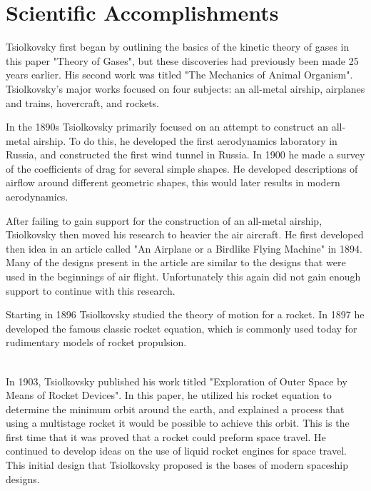 \documentclass[10pt]{armath}
\begin{document}
\section{Scientific Accomplishments}%
\label{sec:scientific_accomplishments}

Tsiolkovsky first began by outlining the basics of the kinetic theory of gases
in this paper "Theory of Gases", but these discoveries had previously been made
25 years earlier. His second work was titled "The Mechanics of Animal
Organism". Tsiolkovsky's major works focused on four subjects: an all-metal
airship, airplanes and trains, hovercraft, and rockets.

In the 1890s Tsiolkovsky primarily focused on an attempt to construct an
all-metal airship. To do this, he developed the first aerodynamics laboratory
in Russia, and constructed the first wind tunnel in Russia. In 1900 he made a
survey of the coefficients of drag for several simple shapes. He developed
descriptions of airflow around different geometric shapes, this would later
results in modern aerodynamics.

After failing to gain support for the construction of an all-metal airship,
Tsiolkovsky then moved his research to heavier the air aircraft. He first
developed then idea in an article called "An Airplane or a Birdlike Flying
Machine" in 1894. Many of the designs present in the article are similar to the
designs that were used in the beginnings of air flight. Unfortunately this again
did not gain enough support to continue with this research.

Starting in 1896 Tsiolkovsky studied the theory of motion for a rocket. In 1897
he developed the famous classic rocket equation, which is commonly used today
for rudimentary models of rocket propulsion.

\begin{align*}
\end{align*}

In 1903, Tsiolkovsky published his work titled "Exploration of Outer Space by
Means of Rocket Devices". In this paper, he utilized his rocket equation to
determine the minimum orbit around the earth, and explained a process that
using a multistage rocket it would be possible to achieve this orbit. This is
the first time that it was proved that a rocket could preform space travel. He
continued to develop ideas on the use of liquid rocket engines for space
travel. This initial design that Tsiolkovsky proposed is the bases of modern
spaceship designs.
\end{document}
